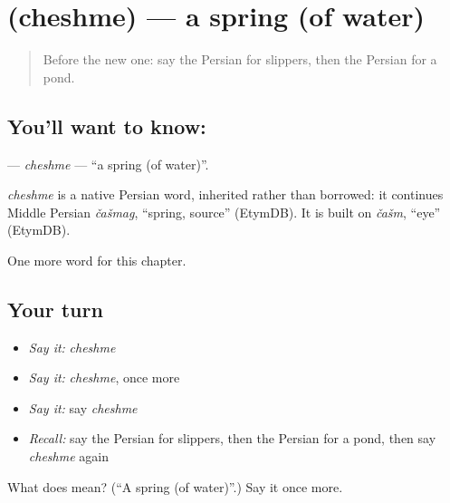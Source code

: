\section[\texorpdfstring{\fa{چشمه} (cheshme)}{چشمه (cheshme)}]{ (cheshme) — a spring (of water)}

\label{lesson:FA-C120-cheshme}



\begin{quote}
Before the new one: say the Persian for slippers, then the Persian for a pond.
\end{quote}

\subsection*{You'll want to know: }
\textbf{} — \emph{cheshme} — \textquotedblleft{}a spring (of water)\textquotedblright{}.

\begin{cousinweb}
\emph{cheshme} is a native Persian word, inherited rather than borrowed: it continues Middle Persian \emph{čašmag}, \textquotedblleft{}spring, source\textquotedblright{} (EtymDB). It is built on \emph{čašm}, \textquotedblleft{}eye\textquotedblright{} (EtymDB).
\end{cousinweb}

\begin{grammarlens}[title={What you've built}]
One more word for this chapter.
\end{grammarlens}

\subsection*{Your turn}
\begin{itemize}
\raggedright
  \item \emph{Say it:} \emph{cheshme}
  \item \emph{Say it:} \emph{cheshme}, once more
  \item \emph{Say it:} say \emph{cheshme}
  \item \emph{Recall:} say the Persian for slippers, then the Persian for a pond, then say \emph{cheshme} again
\end{itemize}

\begin{tcolorbox}[breakable,colback=teal!4,colframe=teal!35!black,title={Before you move on}]
What does  mean? (\textquotedblleft{}A spring (of water)\textquotedblright{}.) Say it once more.
\end{tcolorbox}

